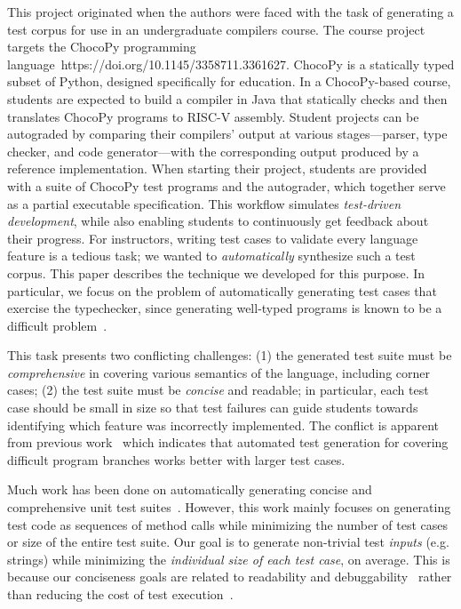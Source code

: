 \documentclass[conference]{IEEEtran}
\begin{document}
This project originated when the authors were faced with the task of generating a test corpus for use in an undergraduate compilers course. The course project targets the ChocoPy programming language~https://doi.org/10.1145/3358711.3361627. ChocoPy is a statically typed subset of Python, designed specifically for education. In a ChocoPy-based course, students are expected to build a compiler in Java that statically checks and then translates ChocoPy programs to RISC-V assembly. Student projects can be autograded by comparing their compilers' output at various stages---parser, type checker, and code generator---with the corresponding output produced by a reference implementation. 
When starting their project, students are provided with a suite of ChocoPy test programs and the autograder, which together serve as a partial executable specification. This workflow simulates \emph{test-driven development}, while also enabling students to continuously get feedback about their progress. For instructors, writing test cases to validate every language feature is a tedious task; we wanted to \emph{automatically} synthesize such a test corpus. This paper describes the technique we developed for this purpose. In particular, we focus on the problem of automatically generating test cases that exercise the typechecker, since generating well-typed programs is known to be a difficult problem~\cite{Yang11, Palka11, Dewey15, Fetscher15}.

This task presents two conflicting challenges: (1) the generated test suite must be \emph{comprehensive} in covering various semantics of the language, including corner cases; (2) the test suite must be \emph{concise} and readable; in particular, each test case should be small in size so that test failures can guide students towards identifying which feature was incorrectly implemented. The conflict is apparent from previous work~\cite{Arcuri12} which indicates that automated test generation for covering difficult program branches works better with larger test cases.

Much work has been done on automatically generating concise and comprehensive unit test suites~\cite{Pacheco07, Fraser10, Fraser12}. However, this work mainly focuses on generating test {code} as sequences of method calls while minimizing the {number of test cases} or {size of the entire test suite}. Our goal is to generate non-trivial test \emph{inputs} (e.g. strings) while minimizing the  \emph{individual size of each test case}, on average. This is because our conciseness goals are related to readability and debuggability~\cite{Lei05, Leitner07} rather than reducing the cost of test execution~\cite{Harman10}. 
\end{document}
